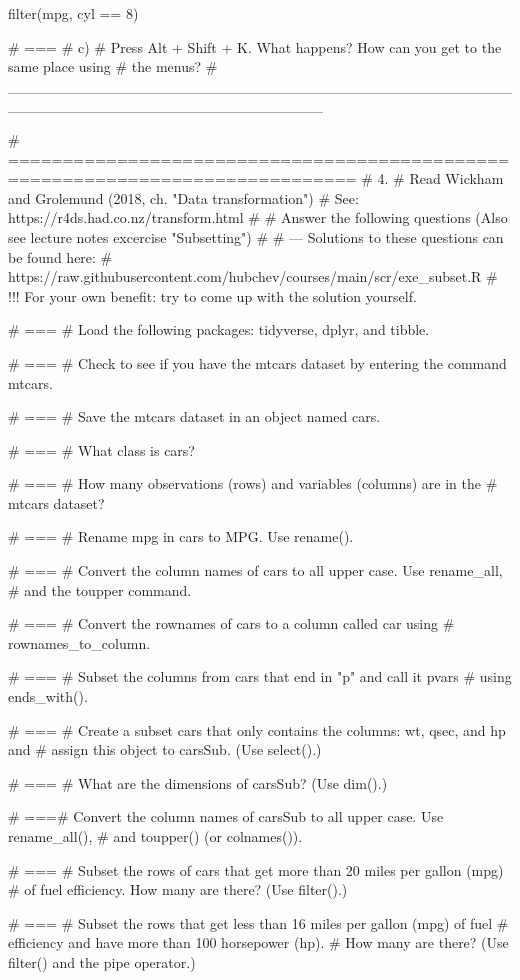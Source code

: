 \begin{rblock1}
filter(mpg, cyl == 8)


# ===
# c)
# Press Alt + Shift + K. What happens? How can you get to the same place using
# the menus?
# ______________________________________________________________________________


# ==============================================================================
# 4. 
# Read Wickham and Grolemund (2018, ch. "Data transformation") 
# See: https://r4ds.had.co.nz/transform.html
# 
# Answer the following questions (Also see lecture notes excercise "Subsetting")
# 
# --- Solutions to these questions can be found here:
# https://raw.githubusercontent.com/hubchev/courses/main/scr/exe_subset.R
# !!! For your own benefit: try to come up with the solution yourself.  

# ===
# Load the following packages: tidyverse, dplyr, and tibble.


# ===
# Check to see if you have the mtcars dataset by entering the command mtcars.


# ===
# Save the mtcars dataset in an object named cars.


# ===
# What class is cars?


# ===
# How many observations (rows) and variables (columns) are in the 
# mtcars dataset?


# ===
# Rename mpg in cars to MPG. Use rename().


# ===
# Convert the column names of cars to all upper case. Use rename\_all, 
# and the toupper command.


# ===
# Convert the rownames of cars to a column called car using 
# rownames\_to\_column. 


# ===
# Subset the columns from cars that end in "p" and call it pvars 
# using ends\_with().


# ===
# Create a subset cars that only contains the columns: wt, qsec, and hp and 
# assign this object to carsSub.  (Use select().)


# ===
# What are the dimensions of carsSub? (Use dim().)


# ===# Convert the column names of carsSub to all upper case. Use rename\_all(), 
# and toupper() (or colnames()).


# ===
# Subset the rows of cars that get more than 20 miles per gallon (mpg) 
# of fuel efficiency. How many are there? (Use filter().)


# ===
# Subset the rows that get less than 16 miles per gallon (mpg) of fuel 
# efficiency and have more than 100 horsepower (hp). 
# How many are there? (Use filter() and the pipe operator.)



\end{rblock1}
